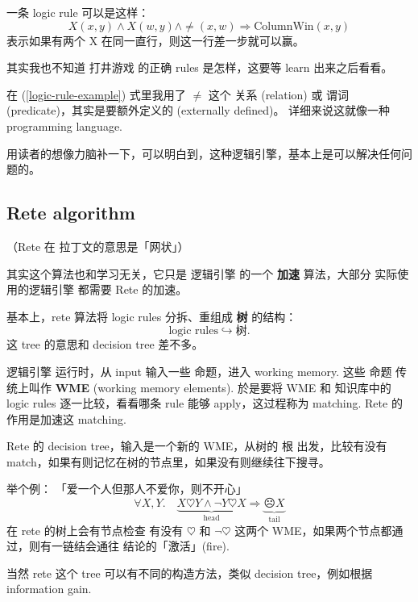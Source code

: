一条 logic rule 可以是这样：
\begin{equation}
\label{logic-rule-example}
X(x, y) \wedge X(w, y) \wedge \neq(x,w) \Rightarrow \text{ColumnWin}(x,y)
\end{equation}
表示如果有两个 X 在同一直行，则这一行差一步就可以赢。

其实我也不知道 打井游戏 的正确 rules 是怎样，这要等 learn 出来之后看看。 

在 (\ref{logic-rule-example}) 式里我用了 $\neq$ 这个 关系 (relation) 或 谓词 (predicate)，其实是要额外定义的 (externally defined)。 详细来说这就像一种 programming language.

用读者的想像力脑补一下，可以明白到，这种逻辑引擎，基本上是可以解决任何问题的。 

\subsection{Rete algorithm}

（Rete 在 拉丁文的意思是「网状」）

其实这个算法也和学习无关，它只是 逻辑引擎 的一个 \textbf{加速} 算法，大部分 实际使用的逻辑引擎 都需要 Rete 的加速。

基本上，rete 算法将 logic rules 分拆、重组成 \textbf{树} 的结构：
\begin{equation}
\boxed{\text{logic rules}} \hookrightarrow \boxed{\text{树}} .
\end{equation}
这 tree 的意思和 decision tree 差不多。

逻辑引擎 运行时，从 input 输入一些 命题，进入 working memory.  这些 命题 传统上叫作 \textbf{WME} (working memory elements).  於是要将 WME 和 知识库中的 logic rules 逐一比较，看看哪条 rule 能够 apply，这过程称为 matching.  Rete 的作用是加速这 matching.

Rete 的 decision tree，输入是一个新的 WME，从树的 根 出发，比较有没有 match，如果有则记忆在树的节点里，如果没有则继续往下搜寻。

举个例： 「爱一个人但那人不爱你，则不开心」
\begin{equation}
\forall X, Y.  \quad \underbrace{X \heartsuit Y \wedge \neg Y \heartsuit X}_{\mbox{head}} \Rightarrow \underbrace{\frownie X}_{\mbox{tail}}
\end{equation}
在 rete 的树上会有节点检查 有没有 $\heartsuit$ 和 $\neg \heartsuit$ 这两个 WME，如果两个节点都通过，则有一链结会通往 结论的「激活」(fire). 

当然 rete 这个 tree 可以有不同的构造方法，类似 decision tree，例如根据 information gain. 

